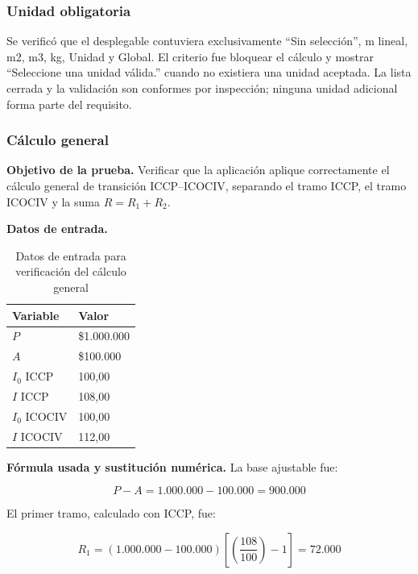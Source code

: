 \documentclass[12pt,letterpaper]{article}
\newcommand{\ICOCIV}{ICOCIV}
\newcommand{\ICCP}{ICCP}
\begin{document}
\subsubsection{Unidad obligatoria}

Se verificó que el desplegable contuviera exclusivamente ``Sin selección'', m lineal, m2, m3, kg, Unidad y Global. El criterio fue bloquear el cálculo y mostrar ``Seleccione una unidad válida.'' cuando no existiera una unidad aceptada. La lista cerrada y la validación son conformes por inspección; ninguna unidad adicional forma parte del requisito.

\subsubsection{Cálculo general}

\textbf{Objetivo de la prueba.} Verificar que la aplicación aplique correctamente el cálculo general de transición \ICCP--\ICOCIV, separando el tramo \ICCP, el tramo \ICOCIV{} y la suma \(R=R_1+R_2\).

\textbf{Datos de entrada.}

\begin{table}[H]
\centering
\caption{Datos de entrada para verificación del cálculo general}
\label{tab:prueba_empalme_general_datos}
\vspace{\baselineskip}
\scriptsize
\begin{tabular}{ll}
\toprule
\textbf{Variable} & \textbf{Valor} \\
\midrule
\(P\) & \$1.000.000 \\
\(A\) & \$100.000 \\
\(I_0\) \ICCP{} & 100,00 \\
\(I\) \ICCP{} & 108,00 \\
\(I_0\) \ICOCIV{} & 100,00 \\
\(I\) \ICOCIV{} & 112,00 \\
\bottomrule
\end{tabular}
\end{table}

\textbf{Fórmula usada y sustitución numérica.} La base ajustable fue:

\begin{equation}
P-A=1.000.000-100.000=900.000
\end{equation}

El primer tramo, calculado con \ICCP, fue:

\begin{equation}
R_1=(1.000.000-100.000)\left[\left(\frac{108}{100}\right)-1\right]=72.000
\end{equation}
\end{document}
